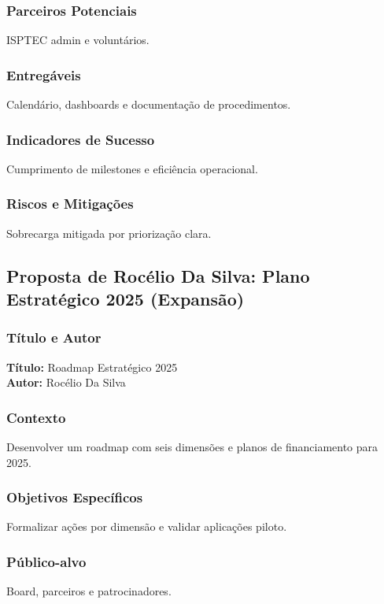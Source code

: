 \documentclass[12pt,a4paper]{article}
\begin{document}
\subsubsection*{Parceiros Potenciais}
ISPTEC admin e voluntários.

\subsubsection*{Entregáveis}
Calendário, dashboards e documentação de procedimentos.

\subsubsection*{Indicadores de Sucesso}
Cumprimento de milestones e eficiência operacional.

\subsubsection*{Riscos e Mitigações}
Sobrecarga mitigada por priorização clara.

\subsection{Proposta de Rocélio Da Silva: Plano Estratégico 2025 (Expansão)}

\subsubsection*{Título e Autor}
\textbf{Título:} Roadmap Estratégico 2025 \\
\textbf{Autor:} Rocélio Da Silva

\subsubsection*{Contexto}
Desenvolver um roadmap com seis dimensões e planos de financiamento para 2025.

\subsubsection*{Objetivos Específicos}
Formalizar ações por dimensão e validar aplicações piloto.

\subsubsection*{Público-alvo}
Board, parceiros e patrocinadores.
\end{document}
